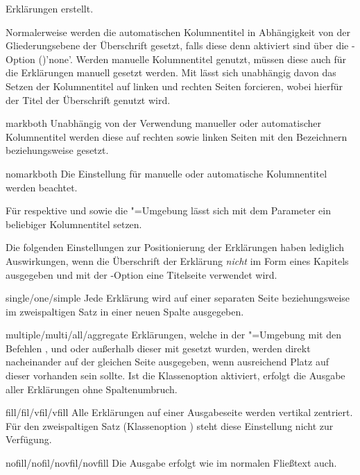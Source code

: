 \begin{Declaration*}{}
\begin{Declaration*}{}
\begin{Declaration*}{}
\begin{Declaration}
\begin{values}{}
  Erklärungen erstellt.
\end{values}
%
Normalerweise werden die automatischen Kolumnentitel in Abhängigkeit von der 
Gliederungsebene der Überschrift gesetzt, falls diese denn aktiviert sind über 
die \KOMAScript-Option ()'none'. 
Werden manuelle Kolumnentitel genutzt, müssen diese auch für die Erklärungen 
manuell gesetzt werden. Mit  lässt sich unabhängig 
davon das Setzen der Kolumnentitel auf linken und rechten Seiten forcieren, 
wobei hierfür der Titel der Überschrift genutzt wird.
%
\begin{values}{}
\item[markboth]
  Unabhängig von der Verwendung manueller oder automatischer Kolumnentitel 
  werden diese auf rechten sowie linken Seiten mit den Bezeichnern 
   beziehungsweise  gesetzt.
\item[nomarkboth]
  Die Einstellung für manuelle oder automatische Kolumnentitel werden beachtet.
\end{values}
%
Für  respektive  und  
sowie die "=Umgebung lässt sich mit dem Parameter 
 ein beliebiger Kolumnentitel setzen. 

Die folgenden Einstellungen zur Positionierung der Erklärungen haben lediglich 
Auswirkungen, wenn die Überschrift der Erklärung \emph{nicht} im Form eines 
Kapitels ausgegeben und mit der \KOMAScript-Option  
eine Titelseite verwendet wird.
%
\begin{values}{}
\item[single/one/simple]
  Jede Erklärung wird auf einer separaten Seite
  beziehungsweise im zweispaltigen Satz in einer neuen Spalte ausgegeben.
\item[multiple/multi/all/aggregate]
  Erklärungen, welche in der "=Umgebung mit den 
  Befehlen ,  und  oder 
  außerhalb dieser mit  gesetzt wurden, werden direkt 
  nacheinander auf der gleichen Seite ausgegeben, wenn ausreichend Platz auf 
  dieser vorhanden sein sollte. Ist die Klassenoption  
  aktiviert, erfolgt die Ausgabe aller Erklärungen ohne Spaltenumbruch.
\item[fill/fil/vfil/vfill]
  Alle Erklärungen auf einer Ausgabeseite werden vertikal zentriert. Für 
  den zweispaltigen Satz (Klassenoption ) steht diese 
  Einstellung nicht zur Verfügung.
\item[nofill/nofil/novfil/novfill]
  Die Ausgabe erfolgt wie im normalen Fließtext auch.
\end{values}
\end{Declaration}


\end{Declaration*}
\end{Declaration*}
\end{Declaration*}
